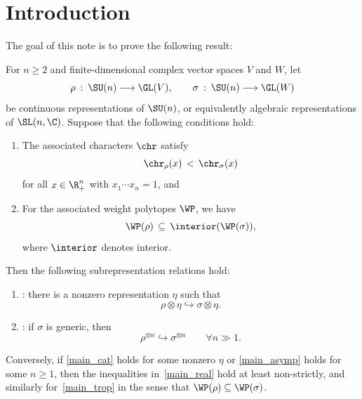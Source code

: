 \section{Introduction}

The goal of this note is to prove the following result:

\begin{thm}
	\label{main}
	For $n \ge 2$ and finite-dimensional complex vector spaces $V$ and $W$, let
	\[
		\rho \: : \: \SU(n) \longrightarrow \GL(V), \qquad \sigma \: : \: \SU(n) \longrightarrow \GL(W)
	\]
	be continuous representations of $\SU(n)$, or equivalently algebraic representations of $\SL(n,\C)$.
	Suppose that the following conditions hold:
	\begin{enumerate}[label=(\roman*)]
		\item\label{main_real} The associated characters $\chr$ satisfy
			\begin{equation}
				\label{main_real_ineq}
				\chr_\rho(x) \,<\, \chr_\sigma(x)
			\end{equation}
			for all $x \in \R_+^n$ with $x_1 \cdots x_n = 1$, and
		\item\label{main_trop} For the associated weight polytopes $\WP$, we have
			\begin{equation}
				\label{main_trop_ineq}
				\WP(\rho) \,\subseteq\, \interior(\WP(\sigma)),
			\end{equation}
			where $\interior$ denotes interior.
	\end{enumerate}
	Then the following subrepresentation relations hold:
	\begin{enumerate}[label=(\alph*)]
		\item {}: there is a nonzero representation $\eta$ such that
			\begin{equation}
				\label{main_cat}
				\rho \otimes \eta \hookrightarrow \sigma \otimes \eta.
			\end{equation}
		\item {}: if $\sigma$ is generic, then
			\begin{equation}
				\label{main_asymp}
				\rho^{\otimes n} \hookrightarrow \sigma^{\otimes n} \qquad \forall n \gg 1.
			\end{equation}
	\end{enumerate}
	Conversely, if \eqref{main_cat} holds for some nonzero $\eta$ or \eqref{main_asymp} holds for some $n \ge 1$, then the inequalities in~\ref{main_real} hold at least non-strictly, and similarly for~\ref{main_trop} in the sense that $\WP(\rho) \subseteq \WP(\sigma)$.
\end{thm}

